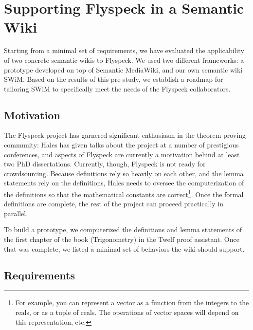 
\section{Supporting Flyspeck in a Semantic Wiki}

Starting from a minimal set of requirements, we have evaluated the
applicability of two concrete semantic wikis to Flyspeck.  We used two
different frameworks: a prototype developed on top of Semantic
MediaWiki, and our own semantic wiki SWiM.  Based on the results of
this pre-study, we establish a roadmap for tailoring SWiM to
specifically meet the needs of the Flyspeck collaborators.

\subsection{Motivation}
\label{sec:req}

The Flyspeck project has garnered significant enthusiasm in the
theorem proving community: Hales has given talks about the project at
a number of prestigious conferences, and aspects of Flyspeck are
currently a motivation behind at least two PhD dissertations.  
Currently, though, Flyspeck is not ready for crowdsourcing.  Because
definitions rely so heavily on each other, and the lemma statements
rely on the definitions, Hales needs to oversee the
computerization of the definitions so that the mathematical constants
are correct\footnote{For example, you can represent a vector as
a function from the integers to the reals, or as a tuple of reals.
The operations of vector spaces will depend on this representation, etc.}.
Once the formal definitions are complete, the rest
of the project can proceed practically in parallel.  

To build a prototype, we computerized the definitions and
lemma statements of the first chapter of
the book (Trigonometry) in the Twelf\cite{Schurmann:1999:Twelf} 
proof assistant.  Once that was complete, we listed a minimal
set of behaviors the wiki should support.


\subsection{Requirements}

